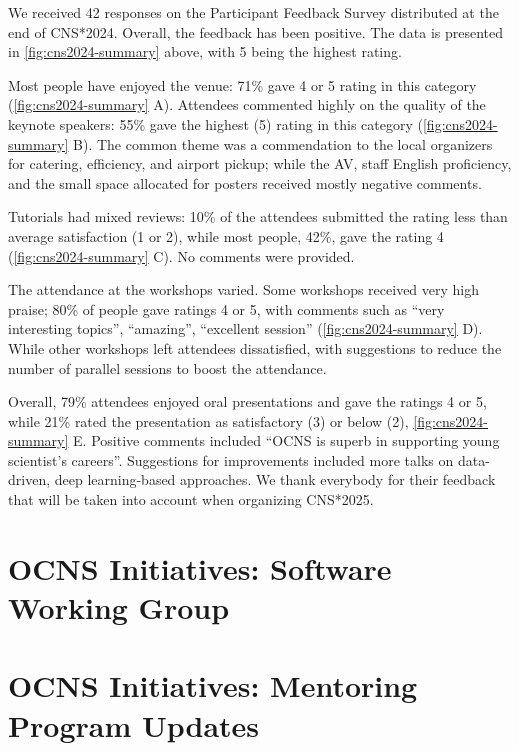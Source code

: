 \documentclass[11pt,a4paper,oneside]{article}
\begin{document}
\noindent{}We received 42 responses on the Participant Feedback Survey distributed at the end of CNS*2024.
Overall, the feedback has been positive. The data is presented in \cref{fig:cns2024-summary} above, with 5 being the highest rating.

Most people have enjoyed the venue: 71\% gave 4 or 5 rating in this category (\cref{fig:cns2024-summary} A).
Attendees commented highly on the quality of the keynote speakers: 55\% gave the highest (5) rating in this category (\cref{fig:cns2024-summary} B).
The common theme was a commendation to the local organizers for catering, efficiency, and airport pickup; while the AV, staff English proficiency, and the small space allocated for posters received mostly negative comments.

Tutorials had mixed reviews: 10\% of the attendees submitted the rating less than average satisfaction (1 or 2), while most people, 42\%, gave the rating 4 (\cref{fig:cns2024-summary} C). No comments were provided.

The attendance at the workshops varied.
Some workshops received very high praise; 80\% of people gave ratings 4 or 5, with comments such as \enquote{very interesting topics}, \enquote{amazing}, \enquote{excellent session} (\cref{fig:cns2024-summary} D).
While other workshops left attendees dissatisfied, with suggestions to reduce the number of parallel sessions to boost the attendance.

Overall, 79\% attendees enjoyed oral presentations and gave the ratings 4 or 5, while 21\% rated the presentation as satisfactory (3) or below (2), \cref{fig:cns2024-summary} E.
Positive comments included \enquote{OCNS is superb in supporting young scientist's careers}.
Suggestions for improvements included more talks on data-driven, deep learning-based approaches.
We thank everybody for their feedback that will be taken into account when organizing CNS*2025.


\newpage
\section*{OCNS Initiatives: Software Working Group}%
\lipsum[1-3]

\newpage
\section*{OCNS Initiatives: Mentoring Program Updates}%
\lipsum[1-3]
\end{document}
